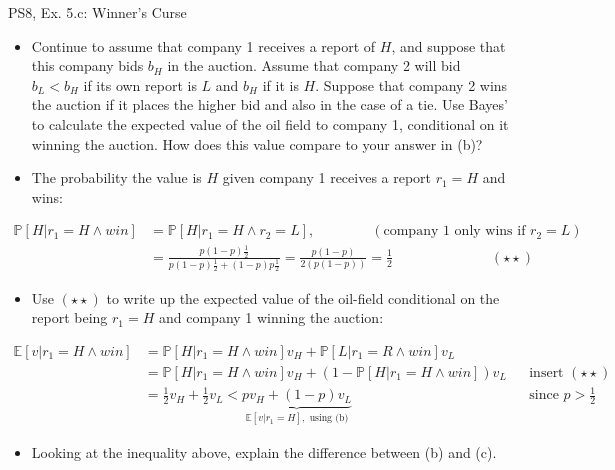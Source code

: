 \begin{frame}{PS8, Ex. 5.c: Winner's Curse}
      \begin{itemize}
        \item[(c)] Continue to assume that company 1 receives a report of $H$, and suppose that this company bids $b_H$ in the auction. Assume that company 2 will bid $b_L < b_H$ if its own report is $L$ and $b_H$ if it is $H$. Suppose that company 2 wins the auction if it places the higher bid and also in the case of a tie. Use Bayes’ to calculate the expected value of the oil field to company 1, conditional on it winning the auction. How does this value compare to your answer in (b)?
        \item[Step 1:] The probability the value is $H$ given company 1 receives a report $r_1=H$ and wins:
        \end{itemize}
        \vspace{-8pt}
        \begin{align*}
          \mathbb{P}[H|r_1=H\wedge win]&=\mathbb{P}[H|r_1=H\wedge r_2=L],\quad\quad\quad\quad(\text{company 1 only wins if }r_2=L)\\
            &=\frac{p(1-p)\frac{1}{2}}{p(1-p)\frac{1}{2}+(1-p)p\frac{1}{2}}=\frac{p(1-p)}{2(p(1-p))}=\frac{1}{2}\quad\quad\quad\quad\quad\quad\quad(\star\star)
        \end{align*}
        \vspace{-8pt}
        \begin{itemize}
        \item[Step 2:] Use $(\star\star)$ to write up the expected value of the oil-field conditional on the report being $r_1=H$ and company 1 winning the auction:
      \end{itemize}
      \vspace{-4pt}
      \begin{align*}
        \mathbb{E}[v|r_1=H\wedge win]&=\mathbb{P}[H|r_1=H\wedge win]v_H+\mathbb{P}[L|r_1=R\wedge win]v_L\\
        &=\mathbb{P}[H|r_1=H\wedge win]v_H+\left(1-\mathbb{P}[H|r_1=H\wedge win]\right)v_L&&\text{insert }(\star\star)\\
        &=\frac{1}{2}v_H+\frac{1}{2}v_L<\underbrace{pv_H+(1-p)v_L}_{\textstyle\mathbb{E}[v|r_1=H],\text{ using (b)}}&&\text{since }p>\frac{1}{2}
      \end{align*}
      \vspace{-10pt}
      \begin{itemize}
        \item[Step 3:] Looking at the inequality above, explain the difference between (b) and (c).
      \end{itemize}
      \vfill\null
\end{frame}
